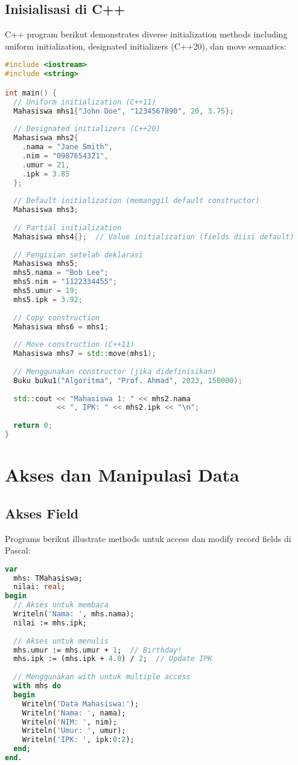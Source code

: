 \documentclass[../main.tex]{subfiles}
\begin{document}
\subsection{Inisialisasi di C++}

C++ program berikut demonstrates diverse initialization methods including uniform initialization, designated initializers (C++20), dan move semantics:

\begin{lstlisting}[language=C++, caption={Inisialisasi struct di C++}]
#include <iostream>
#include <string>

int main() {
  // Uniform initialization (C++11)
  Mahasiswa mhs1{"John Doe", "1234567890", 20, 3.75};
  
  // Designated initializers (C++20)
  Mahasiswa mhs2{
    .nama = "Jane Smith",
    .nim = "0987654321",
    .umur = 21,
    .ipk = 3.85
  };
  
  // Default initialization (memanggil default constructor)
  Mahasiswa mhs3;
  
  // Partial initialization
  Mahasiswa mhs4{};  // Value initialization (fields diisi default)
  
  // Pengisian setelah deklarasi
  Mahasiswa mhs5;
  mhs5.nama = "Bob Lee";
  mhs5.nim = "1122334455";
  mhs5.umur = 19;
  mhs5.ipk = 3.92;
  
  // Copy construction
  Mahasiswa mhs6 = mhs1;
  
  // Move construction (C++11)
  Mahasiswa mhs7 = std::move(mhs1);
  
  // Menggunakan constructor (jika didefinisikan)
  Buku buku1("Algoritma", "Prof. Ahmad", 2023, 150000);
  
  std::cout << "Mahasiswa 1: " << mhs2.nama 
            << ", IPK: " << mhs2.ipk << "\n";
  
  return 0;
}
\end{lstlisting}

\section{Akses dan Manipulasi Data}

\subsection{Akses Field}

Programs berikut illustrate methods untuk access dan modify record fields di Pascal:

\begin{lstlisting}[language=Pascal, caption={Akses field di Pascal}]
var
  mhs: TMahasiswa;
  nilai: real;
begin
  // Akses untuk membaca
  Writeln('Nama: ', mhs.nama);
  nilai := mhs.ipk;
  
  // Akses untuk menulis
  mhs.umur := mhs.umur + 1;  // Birthday!
  mhs.ipk := (mhs.ipk + 4.0) / 2;  // Update IPK
  
  // Menggunakan with untuk multiple access
  with mhs do
  begin
    Writeln('Data Mahasiswa:');
    Writeln('Nama: ', nama);
    Writeln('NIM: ', nim);
    Writeln('Umur: ', umur);
    Writeln('IPK: ', ipk:0:2);
  end;
end.
\end{lstlisting}
\end{document}
